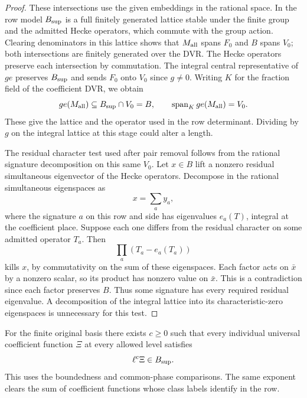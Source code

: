 \begin{proof}
These intersections use the given embeddings in the rational
space. In the row model \(B_{\rm sup}\) is a full finitely
generated lattice stable under the finite group and the
admitted Hecke operators, which commute with the group
action. Clearing denominators in this lattice shows that
\(M_{\rm all}\) spans \(F_0\) and \(B\) spans \(V_0\);
both intersections are finitely generated over the DVR.
The Hecke operators preserve each intersection by commutation.
The integral central representative of \(ge\) preserves \(B_{\rm sup}\) and sends \(F_0\) onto \(V_0\) since \(g\ne0\). Writing \(K\) for the fraction field of the coefficient DVR, we obtain
\[
 ge(M_{\rm all})\subseteq B_{\rm sup}\cap V_0=B,\qquad
 \operatorname{span}_{K}ge(M_{\rm all})=V_0 .
\]
These give the lattice and the operator used in the row
determinant. Dividing by \(g\) on the integral lattice at
this stage could alter a length.

The residual character test used after pair removal follows
from the rational signature decomposition on this same
\(V_0\). Let \(x\in B\) lift a nonzero residual simultaneous
eigenvector of the Hecke operators. Decompose in the rational simultaneous eigenspaces as
\[
 x=\sum_a y_a,
\]
where the signature \(a\) on this row and side has eigenvalues \(e_a(T)\), integral at the coefficient place. Suppose each one differs from the
residual character on some admitted operator \(T_a\). Then
\[
 \prod_a(T_a-e_a(T_a))
\]
kills \(x\), by commutativity
on the sum of these eigenspaces. Each factor acts on
\(\bar x\) by a nonzero scalar, so its product has nonzero
value on \(\bar x\). This is a contradiction since each
factor preserves \(B\). Thus some signature has every
required residual eigenvalue. A decomposition of the
integral lattice into its characteristic-zero eigenspaces
is unnecessary for this test.

\end{proof}

\begin{lemma}
\label{lem:universal-row-denominator}
For the finite original basis there exists \(c\ge0\) such that every individual universal coefficient function \(\Xi\) at every allowed level satisfies
\[
 \ell^c\Xi\in B_{\rm sup}.
\]
This uses the boundedness and common-phase comparisons. The same exponent
clears the sum of coefficient functions whose class labels identify
in the row.
\end{lemma}

